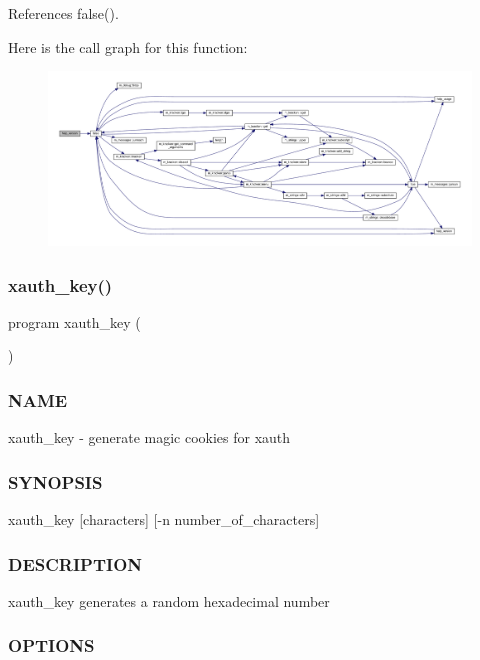 References false().

Here is the call graph for this function\+:
\nopagebreak
\begin{figure}[H]
\begin{center}
\leavevmode
\includegraphics[width=350pt]{xauth__key_8f90_ad2aaabc58e93e13e8a0d5acf843eb5d0_cgraph}
\end{center}
\end{figure}
\mbox{\label{xauth__key_8f90_a0f9a35aa83e47ebe911d6c02ac4f5798}} 
\subsubsection{\texorpdfstring{xauth\+\_\+key()}{xauth\_key()}}
{\footnotesize\ttfamily program xauth\+\_\+key (\begin{DoxyParamCaption}{ }\end{DoxyParamCaption})}



\subsubsection*{N\+A\+ME}

xauth\+\_\+key -\/ generate magic cookies for xauth \subsubsection*{S\+Y\+N\+O\+P\+S\+IS}

xauth\+\_\+key \mbox{[}characters\mbox{]} \mbox{[}-\/n number\+\_\+of\+\_\+characters\mbox{]} \subsubsection*{D\+E\+S\+C\+R\+I\+P\+T\+I\+ON}

xauth\+\_\+key generates a random hexadecimal number \subsubsection*{O\+P\+T\+I\+O\+NS}

